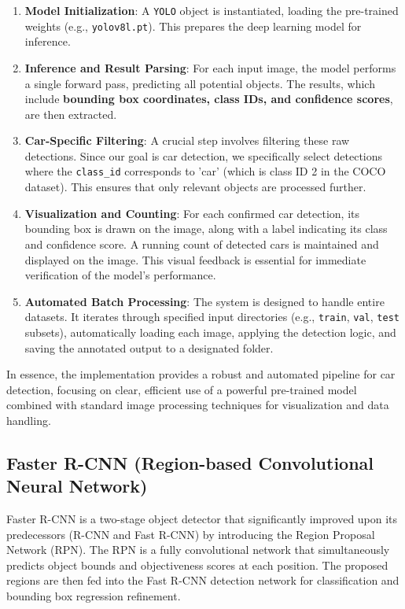 \documentclass[12pt,a4paper]{article}
\begin{document}
\begin{enumerate}
    \item \textbf{Model Initialization}: A \texttt{YOLO} object is instantiated, loading the pre-trained weights (e.g., \texttt{yolov8l.pt}). This prepares the deep learning model for inference.
    \item \textbf{Inference and Result Parsing}: For each input image, the model performs a single forward pass, predicting all potential objects. The results, which include \textbf{bounding box coordinates, class IDs, and confidence scores}, are then extracted.
    \item \textbf{Car-Specific Filtering}: A crucial step involves filtering these raw detections. Since our goal is car detection, we specifically select detections where the \texttt{class\_id} corresponds to 'car' (which is class ID 2 in the COCO dataset). This ensures that only relevant objects are processed further.
    \item \textbf{Visualization and Counting}: For each confirmed car detection, its bounding box is drawn on the image, along with a label indicating its class and confidence score. A running count of detected cars is maintained and displayed on the image. This visual feedback is essential for immediate verification of the model's performance.
    \item \textbf{Automated Batch Processing}: The system is designed to handle entire datasets. It iterates through specified input directories (e.g., \texttt{train}, \texttt{val}, \texttt{test} subsets), automatically loading each image, applying the detection logic, and saving the annotated output to a designated folder.
\end{enumerate}

In essence, the implementation provides a robust and automated pipeline for car detection, focusing on clear, efficient use of a powerful pre-trained model combined with standard image processing techniques for visualization and data handling.

\subsection{Faster R-CNN (Region-based Convolutional Neural Network)}
\label{ssec:fastrcnn}
Faster R-CNN is a two-stage object detector that significantly improved upon its predecessors (R-CNN and Fast R-CNN) by introducing the Region Proposal Network (RPN). The RPN is a fully convolutional network that simultaneously predicts object bounds and objectiveness scores at each position. The proposed regions are then fed into the Fast R-CNN detection network for classification and bounding box regression refinement. 
\end{document}
